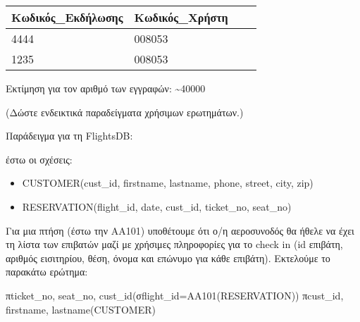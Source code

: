 \begin{tabular}{|p{3cm}|p{4cm}|p{3cm}|p{3cm}|}
  \hline
  Κωδικός\_Εκδήλωσης & Κωδικός\_Χρήστη \\ \hline
  4444 & 008053 \\ \hline
  1235 & 008053 \\ \hline
\end{tabular}
  
Εκτίμηση για τον αριθμό των εγγραφών: \textasciitilde 40000

(Δώστε ενδεικτικά παραδείγματα χρήσιμων ερωτημάτων.)

Παράδειγμα για τη FlightsDB:

έστω οι σχέσεις:

\begin{itemize}[noitemsep]
\item CUSTOMER(cust\_id, firstname, lastname, phone, street, city,
  zip)
\item RESERVATION(flight\_id, date, cust\_id, ticket\_no, seat\_no)
\end{itemize}

Για μια πτήση (έστω την AA101) υποθέτουμε ότι ο/η αεροσυνοδός θα ήθελε
να έχει τη λίστα των επιβατών μαζί με χρήσιμες πληροφορίες για το
check in (id επιβάτη, αριθμός εισιτηρίου, θέση, όνομα και επώνυμο για
κάθε επιβάτη). Εκτελούμε το παρακάτω ερώτημα:

πticket\_no, seat\_no, cust\_id(σflight\_id=AA101(RESERVATION))
πcust\_id, firstname, lastname(CUSTOMER)


